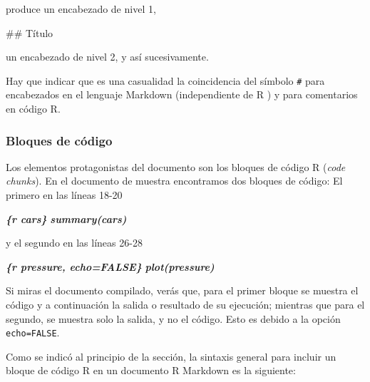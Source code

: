 \documentclass[
  title=normal,
  notoc,
  bib=normal]{mnye}
\newenvironment{Shaded}{\begin{snugshade}}{\end{snugshade}}
\newcommand{\FunctionTok}[1]{\textcolor[rgb]{0.00,0.00,0.00}{#1}}
\newcommand{\InformationTok}[1]{\textcolor[rgb]{0.56,0.35,0.01}{\textbf{\textit{#1}}}}
\begin{document}
produce un encabezado de nivel 1,

\begin{Shaded}
\begin{Highlighting}[]
\FunctionTok{\#\# Título}
\end{Highlighting}
\end{Shaded}

un encabezado de nivel 2, y así sucesivamente.

Hay que indicar que es una casualidad la coincidencia del símbolo \texttt{\#} para encabezados en el lenguaje Markdown (independiente de \textsf{R} ) y para comentarios en código \textsf{R}.

\hypertarget{bloques-de-cuxf3digo}{%
\subsubsection{Bloques de código}\label{bloques-de-cuxf3digo}}

Los elementos protagonistas del documento son los bloques de código \textsf{R} (\emph{code chunks}). En el documento de muestra encontramos dos bloques de código: El primero en las líneas 18-20

\begin{Shaded}
\begin{Highlighting}[]
\InformationTok{\textasciigrave{}\textasciigrave{}\textasciigrave{}\{r cars\}}
\InformationTok{summary(cars)}
\InformationTok{\textasciigrave{}\textasciigrave{}\textasciigrave{}}
\end{Highlighting}
\end{Shaded}

y el segundo en las líneas 26-28

\begin{Shaded}
\begin{Highlighting}[]
\InformationTok{\textasciigrave{}\textasciigrave{}\textasciigrave{}\{r pressure, echo=FALSE\}}
\InformationTok{plot(pressure)}
\InformationTok{\textasciigrave{}\textasciigrave{}\textasciigrave{}}
\end{Highlighting}
\end{Shaded}

Si miras el documento compilado, verás que, para el primer bloque se muestra el código y a continuación la salida o resultado de su ejecución; mientras que para el segundo, se muestra solo la salida, y no el código. Esto es debido a la opción \texttt{echo=FALSE}.

Como se indicó al principio de la sección, la sintaxis general para incluir un bloque de código \textsf{R} en un documento R Markdown es la siguiente:
\end{document}
